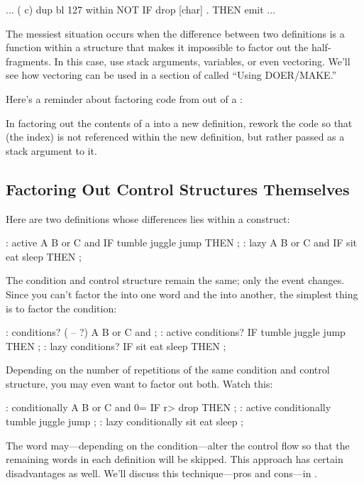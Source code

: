 \begin{Code}
... ( c)  dup  bl 127 within NOT
       IF  drop  [char] .  THEN  emit  ...
\end{Code}
The messiest situation occurs when the difference between two
definitions is a function within a structure that makes it impossible
to factor out the half-fragments. In this case, use stack arguments,
variables, or even vectoring. We'll see how vectoring can be used in a
section of  called ``Using DOER/MAKE.''

Here's a reminder about factoring code from out of a :

\begin{tip}
In factoring out the contents of a  into a new
definition, rework the code so that  (the index) is not
referenced within the new definition, but rather passed as a stack
argument to it.
\end{tip}

\subsection{Factoring Out Control Structures Themselves}

Here are two definitions whose differences lies within a 
 construct:

\begin{Code}
: active    A B or  C and  IF  tumble juggle jump THEN ;
: lazy      A B or  C and  IF   sit  eat  sleep   THEN ;
\end{Code}
The condition and control structure remain the same; only the event
changes. Since you can't factor the  into one word and the
 into another, the simplest thing is to factor the
condition:

\begin{Code}
: conditions? ( -- ?) A B or C and ;
: active    conditions? IF tumble juggle jump THEN ;
: lazy      conditions? IF    sit  eat  sleep THEN ;
\end{Code}

\noindent 
Depending on the number of repetitions of the same condition and
control structure, you may even want to factor out both. Watch this:

\begin{Code}
: conditionally   A B or  C and 0= IF  r> drop   THEN ;
: active   conditionally   tumble juggle jump ;
: lazy   conditionally  sit  eat  sleep ;
\end{Code}
The word  may---depending on the condition---alter
the control flow so that the remaining words in each definition will be
skipped. This approach has certain disadvantages as well. We'll
discuss this technique---pros and cons---in .

